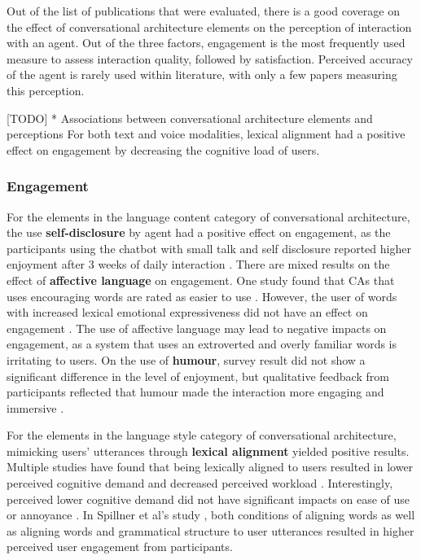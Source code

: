 \documentclass[sigconf,screen,review, anonymous]{acmart}
\newcommand{\cmt}[1]{}%
\begin{document}
Out of the list of publications that were evaluated, there is a good coverage on the effect of conversational architecture elements on the perception of interaction with an agent. Out of the three factors, engagement is the most frequently used measure to assess interaction quality, followed by satisfaction. Perceived accuracy of the agent is rarely used within literature, with only a few papers measuring this perception. 

[TODO] * Associations between conversational architecture elements and perceptions
For both text and voice modalities, lexical alignment had a positive effect on engagement by decreasing the cognitive load of users. 

\subsubsection{Engagement}
For the elements in the language content category of conversational architecture, the use \textbf{self-disclosure} by agent had a positive effect on engagement, as the participants using the chatbot with small talk and self disclosure reported higher enjoyment after 3 weeks of daily interaction \cite{lee2020hear}\cmt{[23]}. There are mixed results on the effect of \textbf{affective language} on engagement. One study found that CAs that uses encouraging words are rated as easier to use \cite{healey2013relating}\cmt{[39]}. However, the user of words with increased lexical emotional expressiveness did not have an effect on engagement \cite{zhu2022effects}\cmt{[26]}. The use of affective language may lead to negative impacts on engagement, as a system that uses an extroverted and overly familiar words is irritating to users. On the use of \textbf{humour}, survey result did not show a significant difference in the level of enjoyment, but qualitative feedback from participants reflected that humour made the interaction more engaging and immersive \cite{ceha2021can}\cmt{[57]}.

For the elements in the language style category of conversational architecture, mimicking users' utterances through \textbf{lexical alignment} yielded positive results. Multiple studies have found that being lexically aligned to users resulted in lower perceived cognitive demand and decreased perceived workload \cite{huiyang2022improving}\cmt{[17]}\cite{linnemann2018can}\cmt{[15]}\cite{spillner2021talk}\cmt{[18]}. Interestingly, perceived lower cognitive demand did not have significant impacts on ease of use \cite{linnemann2018can}\cmt{[15]} or annoyance \cite{huiyang2022improving}\cmt{[17]}. In Spillner et al's study \cite{spillner2021talk}\cmt{[18]}, both conditions of aligning words as well as aligning words and grammatical structure to user utterances resulted in higher perceived user engagement from participants. 
\end{document}
